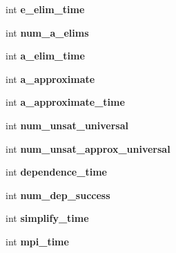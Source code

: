 \begin{DoxyCompactItemize}
\item 
\hypertarget{classMSAFinder_a9fc51cfb947318b263392a048cd759d0}{int {\bfseries e\-\_\-elim\-\_\-time}}\label{classMSAFinder_a9fc51cfb947318b263392a048cd759d0}

\item 
\hypertarget{classMSAFinder_af5d685140bc2bbca181b8d6e4c6a2987}{int {\bfseries num\-\_\-a\-\_\-elims}}\label{classMSAFinder_af5d685140bc2bbca181b8d6e4c6a2987}

\item 
\hypertarget{classMSAFinder_a14cb7b8e44dbabf194a515e832a4af94}{int {\bfseries a\-\_\-elim\-\_\-time}}\label{classMSAFinder_a14cb7b8e44dbabf194a515e832a4af94}

\item 
\hypertarget{classMSAFinder_a421e15cf6cce0a7c42542449df47e9b8}{int {\bfseries a\-\_\-approximate}}\label{classMSAFinder_a421e15cf6cce0a7c42542449df47e9b8}

\item 
\hypertarget{classMSAFinder_ad362b36bca3886acbed19bb5c0563cfa}{int {\bfseries a\-\_\-approximate\-\_\-time}}\label{classMSAFinder_ad362b36bca3886acbed19bb5c0563cfa}

\item 
\hypertarget{classMSAFinder_aaf66c483fd42f4efa4e8f9efab0ce726}{int {\bfseries num\-\_\-unsat\-\_\-universal}}\label{classMSAFinder_aaf66c483fd42f4efa4e8f9efab0ce726}

\item 
\hypertarget{classMSAFinder_ab2356dba9e517906627e119f3510d44b}{int {\bfseries num\-\_\-unsat\-\_\-approx\-\_\-universal}}\label{classMSAFinder_ab2356dba9e517906627e119f3510d44b}

\item 
\hypertarget{classMSAFinder_a7851b9b4684eaa4ee979c4009ea14956}{int {\bfseries dependence\-\_\-time}}\label{classMSAFinder_a7851b9b4684eaa4ee979c4009ea14956}

\item 
\hypertarget{classMSAFinder_ae801e8c605d4c6922ec49cbff47e88f3}{int {\bfseries num\-\_\-dep\-\_\-success}}\label{classMSAFinder_ae801e8c605d4c6922ec49cbff47e88f3}

\item 
\hypertarget{classMSAFinder_a4db5a809f0bb9b43881298c88abffe53}{int {\bfseries simplify\-\_\-time}}\label{classMSAFinder_a4db5a809f0bb9b43881298c88abffe53}

\item 
\hypertarget{classMSAFinder_a025777870f3a665e6d44f0ff605f7592}{int {\bfseries mpi\-\_\-time}}\label{classMSAFinder_a025777870f3a665e6d44f0ff605f7592}


\end{DoxyCompactItemize}
